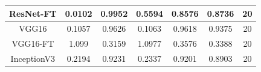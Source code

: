 \documentclass[11pt,a4paper]{article}
\theoremstyle{definition}
\begin{document}
\begin{table}[H]
\begin{tabular}{|c|c|c|c|c|c|c|}
\hline
ResNet-FT                                           & \textcolor[rgb]{0.129,0.129,0.129}{0.0102 } & \textcolor[rgb]{0.129,0.129,0.129}{0.9952 } & \textcolor[rgb]{0.129,0.129,0.129}{0.5594 }                                                                       & \textcolor[rgb]{0.129,0.129,0.129}{0.8576}                                                                             & \textcolor[rgb]{0.129,0.129,0.129}{0.8736}                                                                       & 20                                                                                                              \\
\hline
VGG16                                               & \textcolor[rgb]{0.129,0.129,0.129}{0.1057 } & \textcolor[rgb]{0.129,0.129,0.129}{0.9626 } & \textcolor[rgb]{0.129,0.129,0.129}{0.1063 }                                                                       & \textcolor[rgb]{0.129,0.129,0.129}{0.9618}                                                                             & \textcolor[rgb]{0.129,0.129,0.129}{0.9375}                                                                       & 20                                                                                                              \\
\hline
VGG16-FT                                            & \textcolor[rgb]{0.129,0.129,0.129}{1.099}   & \textcolor[rgb]{0.129,0.129,0.129}{0.3159 } & \textcolor[rgb]{0.129,0.129,0.129}{1.0977 }                                                                       & \textcolor[rgb]{0.129,0.129,0.129}{0.3576}                                                                             & \textcolor[rgb]{0.129,0.129,0.129}{0.3388}                                                                       & 20                                                                                                              \\
\hline
\rowcolor{green} InceptionV3                        & \textcolor[rgb]{0.129,0.129,0.129}{0.2194 } & \textcolor[rgb]{0.129,0.129,0.129}{0.9231 } & \textcolor[rgb]{0.129,0.129,0.129}{0.2337 }                                                                       & \textcolor[rgb]{0.129,0.129,0.129}{0.9201}                                                                             & \textcolor[rgb]{0.129,0.129,0.129}{0.8903}                                                                       & 20                                                                                                              \\
\hline
\end{tabular}
\end{table}
\end{document}
